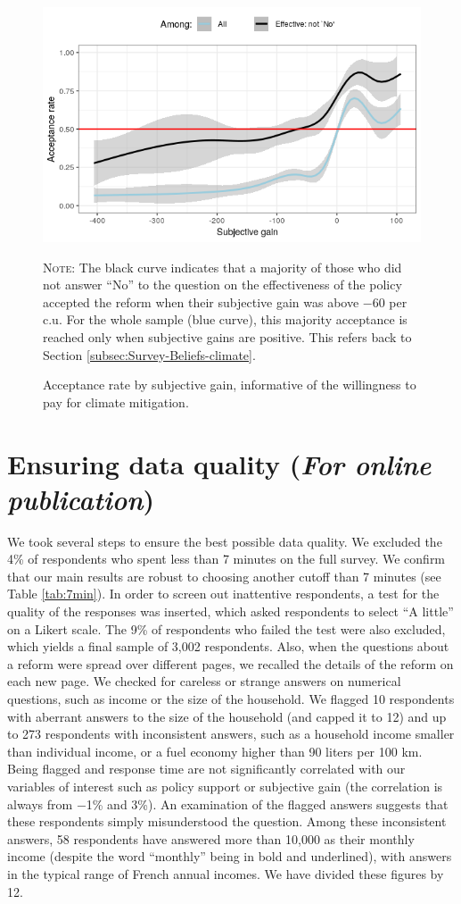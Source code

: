 \documentclass[12pt]{article} %
\begin{document}
\begin{appendices}
\begin{figure}[H]
\centering
\includegraphics[width=0.7\columnwidth]{Images/WTP_Both.png}
{\footnotesize \parbox[t]{\textwidth}{\linespread{1.2}\selectfont \textsc{Note:} The black curve indicates that a majority of those who did not answer ``No'' to the question on the effectiveness of the policy accepted the reform when their subjective gain was above $-$60\euros{} per c.u. For the whole sample (blue curve), this majority acceptance is reached only when subjective gains are positive. This refers back to Section \ref{subsec:Survey-Beliefs-climate}.} \caption{Acceptance rate by subjective gain, informative of the willingness to pay for climate mitigation.\label{fig:WTP}}} %
\end{figure}

\section{Ensuring data quality (\emph{For online publication})}\label{app:speed} %

We took several steps to ensure the best possible data quality. We excluded the 4\% of respondents who spent less than 7 minutes on the full survey. We confirm that our main results are robust to choosing another cutoff than 7 minutes (see Table \ref{tab:7min}). In order to screen out inattentive respondents, a test for the quality of the responses was inserted, which asked respondents to select ``A little'' on a Likert scale. The 9\% of respondents who failed the test were also excluded, which yields a final sample of 3,002 respondents. Also, when the questions about a reform were spread over different pages, we recalled the details of the reform on each new page. We checked for careless or strange answers on numerical questions, such as income or the size of the household. We flagged 10 respondents with aberrant answers to the size of the household (and capped it to 12) and up to 273 respondents with inconsistent answers, such as a household income smaller than individual income, or a fuel economy higher than 90 liters per 100 km. Being flagged and response time are not significantly correlated with our variables of interest such as policy support or subjective gain (the correlation is always from $-$1\% and 3\%). An examination of the flagged answers suggests that these respondents simply misunderstood the question. Among these inconsistent answers, 58 respondents have answered more than 10,000\euros{} as their monthly income (despite the word ``monthly'' being in bold and underlined), with answers in the typical range of French annual incomes. We have divided these figures by 12. 


\end{appendices}
\end{document}
